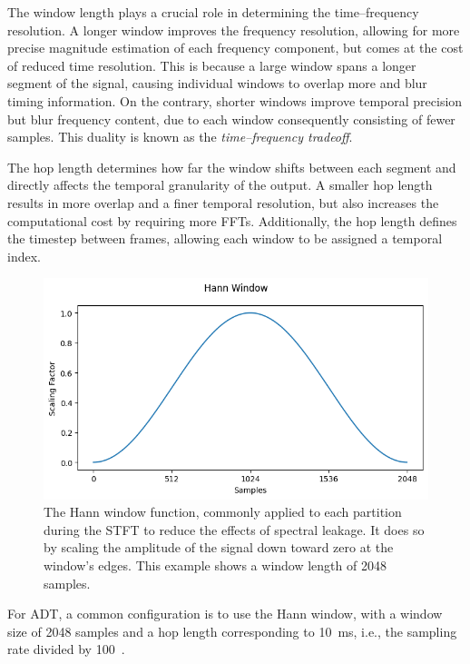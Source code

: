 The window length plays a crucial role in determining the time–frequency resolution. A longer window improves the frequency resolution, allowing for more precise magnitude estimation of each frequency component, but comes at the cost of reduced time resolution. This is because a large window spans a longer segment of the signal, causing individual windows to overlap more and blur timing information. On the contrary, shorter windows improve temporal precision but blur frequency content, due to each window consequently consisting of fewer samples. This duality is known as the \textit{time–frequency tradeoff}.

The hop length determines how far the window shifts between each segment and directly affects the temporal granularity of the output. A smaller hop length results in more overlap and a finer temporal resolution, but also increases the computational cost by requiring more \glspl{FFT}. Additionally, the hop length defines the timestep between frames, allowing each window to be assigned a temporal index.

\begin{figure}[H]
    \centering
    \includegraphics[scale=0.8]{figures/hann}
    \caption{The Hann window function, commonly applied to each partition during the \gls{STFT} to reduce the effects of spectral leakage. It does so by scaling the amplitude of the signal down toward zero at the window's edges. This example shows a window length of 2048 samples.}
    \label{HannWindowFigure}
\end{figure}

For \gls{ADT}, a common configuration is to use the Hann window, with a window size of 2048 samples and a hop length corresponding to 10~ms, i.e., the sampling rate divided by 100~\cite{8350302, vogl2016recurrent,vogl2018multiinstrumentdrumtranscription, signals4040042}.


